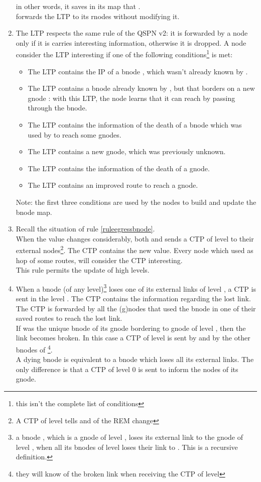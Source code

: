 \documentclass[a4paper]{article}
\begin{document}
\begin{enumerate}
		in other words, it saves in its map that .\\
		 forwards the LTP to its rnodes without modifying it.
	\item The LTP respects the same rule of the QSPN v2: it is forwarded
		by a node only if it is carries interesting information,
		otherwise it is dropped. A
		node  consider the LTP interesting if one of the following
		conditions\footnote{this isn't the complete list of
		conditions} is met:
		\begin{itemize}
			\item The LTP contains the IP of a bnode , which wasn't
				already known by .
			\item The LTP contains a bnode already known by , but that
				borders on a new gnode : with this LTP, the
				node  learns that it can reach  by
				passing through the bnode.
			\item The LTP contains the information of the death of
				a bnode which was used by  to reach some
				gnodes.
			\item The LTP contains a new gnode, which was
				previously unknown.
			\item The LTP contains the information of the death of a
				gnode.
			\item The LTP contains an improved route to reach a
				gnode.
		\end{itemize}
		Note: the first three conditions are used by the nodes to
		build and update the bnode map.
	\item \label{rule6}
		Recall the situation of rule \ref{ruleegressbnode}.\\
		When the value  changes
		considerably,
		both  and  sends a CTP of level  to their external
		nodes\footnote{A CTP of level  tells  and  of the
		REM change}. The CTP contains the new  value. Every node which used  as hop of some routes,
		will consider the CTP interesting.\\
		This rule permits the update of high levels.
	\item \label{rule7}
		When a bnode  (of any level)\footnote{a bnode , which is a
		gnode of level , loses its external link to the gnode
		 of level , when all its
		bnodes of level  loses their link to . This is a
		recursive definition.}
		loses one of its external links of
		level , a CTP is sent in the level .  The CTP contains
		the information regarding the lost link.
		The CTP is forwarded by all the (g)nodes that used the
		bnode  in one of their saved routes to reach the lost link.\\
		If  was the unique bnode of its gnode 
		bordering to gnode  of level , then the link
		 becomes broken. In this case a CTP of
		level  is sent by  and by the other bnodes of
		\footnote{they will know of the broken link when receiving
		the CTP of level }.\\
		A dying bnode is equivalent to a bnode which loses all its
		external links. The only difference is that a CTP of level 0
		is sent to inform the nodes of its gnode.
\end{enumerate}
\end{document}
